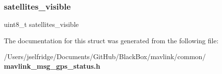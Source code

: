 \subsubsection{satellites\+\_\+visible}
{\footnotesize\ttfamily uint8\+\_\+t satellites\+\_\+visible}



The documentation for this struct was generated from the following file\+:\begin{DoxyCompactItemize}
\item 
/\+Users/jselfridge/\+Documents/\+Git\+Hub/\+Black\+Box/mavlink/common/\textbf{ mavlink\+\_\+msg\+\_\+gps\+\_\+status.\+h}\end{DoxyCompactItemize}
